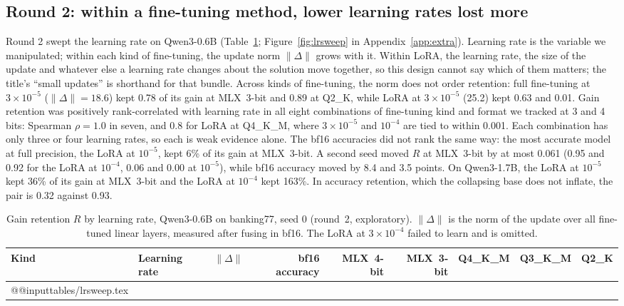\documentclass[10pt]{article}
\makeatletter
\newcommand*{\tablerows}[1]{\csname @@input\endcsname #1 }
\makeatother
\begin{document}
\subsection{Round 2: within a fine-tuning method, lower learning rates lost more}
\label{sec:lr}

Round 2 swept the learning rate on Qwen3-0.6B (Table~\ref{tab:lrsweep}; Figure~\ref{fig:lrsweep} in Appendix~\ref{app:extra}). Learning rate is the variable we manipulated; within each kind of fine-tuning, the update norm $\lVert\Delta\rVert$ grows with it. Within LoRA, the learning rate, the size of the update and whatever else a learning rate changes about the solution move together, so this design cannot say which of them matters; the title's ``small updates'' is shorthand for that bundle. Across kinds of fine-tuning, the norm does not order retention: full fine-tuning at $3\times10^{-5}$ ($\lVert\Delta\rVert = 18.6$) kept 0.78 of its gain at MLX~3-bit and 0.89 at Q2\_K, while LoRA at $3\times10^{-5}$ (25.2) kept 0.63 and 0.01. Gain retention was positively rank-correlated with learning rate in all eight combinations of fine-tuning kind and format we tracked at 3 and 4 bits: Spearman $\rho = 1.0$ in seven, and $0.8$ for LoRA at Q4\_K\_M, where $3\times10^{-5}$ and $10^{-4}$ are tied to within 0.001. Each combination has only three or four learning rates, so each is weak evidence alone. The bf16 accuracies did not rank the same way: the most accurate model at full precision, the LoRA at $10^{-5}$, kept 6\% of its gain at MLX~3-bit. A second seed moved $R$ at MLX~3-bit by at most 0.061 (0.95 and 0.92 for the LoRA at $10^{-4}$, 0.06 and 0.00 at $10^{-5}$), while bf16 accuracy moved by 8.4 and 3.5 points. On Qwen3-1.7B, the LoRA at $10^{-5}$ kept 36\% of its gain at MLX~3-bit and the LoRA at $10^{-4}$ kept 163\%. In accuracy retention, which the collapsing base does not inflate, the pair is 0.32 against 0.93.

\begin{table}[htbp]
\centering\small
\caption{Gain retention $R$ by learning rate, Qwen3-0.6B on banking77, seed 0 (round~2, exploratory). $\lVert\Delta\rVert$ is the norm of the update over all fine-tuned linear layers, measured after fusing in bf16. The LoRA at $3\times10^{-4}$ failed to learn and is omitted.}
\label{tab:lrsweep}
\begin{tabular}{llrrrrrrr}
\toprule
Kind & Learning rate & $\lVert\Delta\rVert$ & bf16 accuracy & MLX~4-bit & MLX~3-bit & Q4\_K\_M & Q3\_K\_M & Q2\_K \\
\midrule
\tablerows{tables/lrsweep.tex}
\bottomrule
\end{tabular}
\end{table}
\end{document}
